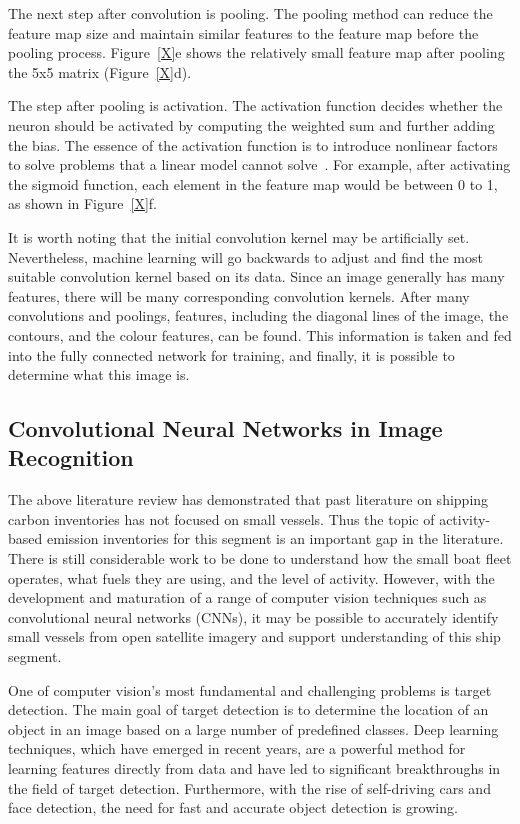The next step after convolution is pooling. The pooling method can reduce the feature map size and maintain similar features to the feature map before the pooling process. Figure~\ref{X}e shows the relatively small feature map after pooling the 5x5 matrix (Figure~\ref{X}d).


The step after pooling is activation. The activation function decides whether the neuron should be activated by computing the weighted sum and further adding the bias. The essence of the activation function is to introduce nonlinear factors to solve problems that a linear model cannot solve~\cite{lin2018research}. For example, after activating the sigmoid function, each element in the feature map would be between 0 to 1, as shown in Figure~\ref{X}f.

It is worth noting that the initial convolution kernel may be artificially set. Nevertheless, machine learning will go backwards to adjust and find the most suitable convolution kernel based on its data. Since an image generally has many features, there will be many corresponding convolution kernels. After many convolutions and poolings, features, including the diagonal lines of the image, the contours, and the colour features, can be found. This information is taken and fed into the fully connected network for training, and finally, it is possible to determine what this image is.


\subsection{Convolutional Neural Networks in Image Recognition}
\label{sec2.2}
The above literature review has demonstrated that past literature on shipping carbon inventories has not focused on small vessels. Thus the topic of activity-based emission inventories for this segment is an important gap in the literature. There is still considerable work to be done to understand how the small boat fleet operates, what fuels they are using, and the level of activity. However, with the development and maturation of a range of computer vision techniques such as convolutional neural networks (CNNs), it may be possible to accurately identify small vessels from open satellite imagery and support understanding of this ship segment. 

One of computer vision's most fundamental and challenging problems is target detection. The main goal of target detection is to determine the location of an object in an image based on a large number of predefined classes. Deep learning techniques, which have emerged in recent years, are a powerful method for learning features directly from data and have led to significant breakthroughs in the field of target detection. Furthermore, with the rise of self-driving cars and face detection, the need for fast and accurate object detection is growing.

